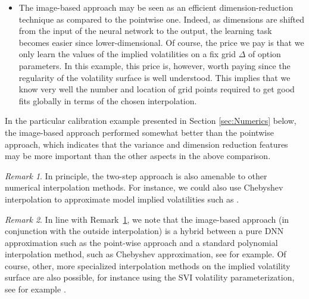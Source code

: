 \documentclass{article}
\theoremstyle{remark}
\newtheorem{remark}{Remark}
\def\red#1{\textcolor{red}{#1}}
\begin{document}
\begin{itemize}

\item The image-based approach may be seen as an efficient dimension-reduction
technique as compared to the pointwise one. Indeed, as dimensions are shifted
from the input of the neural network to the output, the learning task becomes
easier since lower-dimensional. Of course, the price we pay is that we only
learn the values of the implied volatilities on a fix grid $\Delta$ of option
parameters. In this example, this price is, however, worth paying since the
regularity of the volatility surface is well understood. This implies that we
know very well the number and location of grid points required to get good
fits globally in terms of the chosen interpolation.
\end{itemize}

In the particular calibration example presented in Section \ref{sec:Numerics} below, the image-based
approach performed somewhat better than the pointwise approach, which indicates
that the variance and dimension reduction features may be more important than
the other aspects in the above comparison.

\begin{remark}
  \label{rem:chebyshev}
  In principle, the two-step approach is also amenable to other numerical
  interpolation methods. For instance, we could also use Chebyshev
  interpolation to approximate model implied volatilities such as \cite{Glau19}.
\end{remark}
\begin{remark}
  \label{rem:chebyshev-2}
  In line with Remark~\ref{rem:chebyshev}, we note that the image-based
  approach (in conjunction with the outside interpolation) is a hybrid between
  a pure DNN approximation such as the point-wise approach and a standard
  polynomial interpolation method, such as Chebyshev approximation, see
  \cite{Glau19} for example. Of course, other, more specialized interpolation
  methods on the implied volatility surface are also possible, for instance
  using the SVI volatility parameterization, see for example \cite{Itkin14}.
\end{remark}
\end{document}
